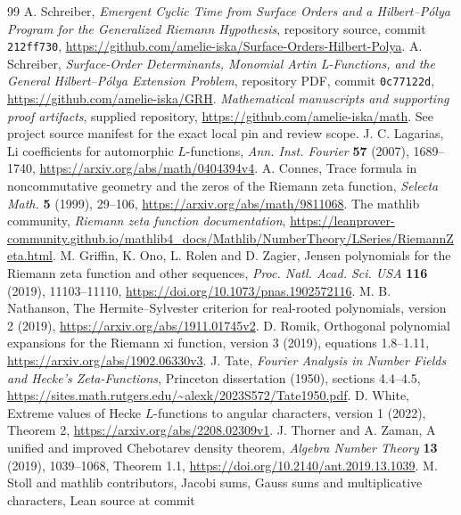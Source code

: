 \begin{thebibliography}{99}
 A. Schreiber, \emph{Emergent Cyclic Time from Surface Orders and a Hilbert--P\'olya Program for the Generalized Riemann Hypothesis}, repository source,
commit \texttt{212ff730}, \url{https://github.com/amelie-iska/Surface-Orders-Hilbert-Polya}.
 A. Schreiber, \emph{Surface-Order Determinants, Monomial Artin L-Functions, and the General Hilbert--P\'olya Extension Problem}, repository PDF,
commit \texttt{0c77122d}, \url{https://github.com/amelie-iska/GRH}.
 \emph{Mathematical manuscripts and supporting proof artifacts}, supplied repository, \url{https://github.com/amelie-iska/math}. See project source manifest for the exact local pin and review scope.
 J. C. Lagarias, Li coefficients for automorphic $L$-functions,
\emph{Ann. Inst. Fourier} \textbf{57} (2007), 1689--1740,
\url{https://arxiv.org/abs/math/0404394v4}.
 A. Connes, Trace formula in noncommutative geometry and the zeros
of the Riemann zeta function, \emph{Selecta Math.} \textbf{5} (1999), 29--106,
\url{https://arxiv.org/abs/math/9811068}.
 The mathlib community, \emph{Riemann zeta function documentation},
\url{https://leanprover-community.github.io/mathlib4_docs/Mathlib/NumberTheory/LSeries/RiemannZeta.html}.
 M. Griffin, K. Ono, L. Rolen and D. Zagier,
Jensen polynomials for the Riemann zeta function and other sequences,
\emph{Proc. Natl. Acad. Sci. USA} \textbf{116} (2019), 11103--11110,
\url{https://doi.org/10.1073/pnas.1902572116}.
 M. B. Nathanson, The Hermite--Sylvester criterion
for real-rooted polynomials, version 2 (2019),
\url{https://arxiv.org/abs/1911.01745v2}.
 D. Romik, Orthogonal polynomial expansions for the Riemann
xi function, version 3 (2019), equations 1.8--1.11,
\url{https://arxiv.org/abs/1902.06330v3}.
 J. Tate, \emph{Fourier Analysis in Number Fields and Hecke's
Zeta-Functions}, Princeton dissertation (1950), sections 4.4--4.5,
\url{https://sites.math.rutgers.edu/~alexk/2023S572/Tate1950.pdf}.
 D. White, Extreme values of Hecke $L$-functions to angular
characters, version 1 (2022), Theorem 2,
\url{https://arxiv.org/abs/2208.02309v1}.
 J. Thorner and A. Zaman, A unified and improved Chebotarev
density theorem, \emph{Algebra Number Theory} \textbf{13} (2019),
1039--1068, Theorem 1.1,
\url{https://doi.org/10.2140/ant.2019.13.1039}.
 M. Stoll and mathlib contributors, Jacobi sums,
Gauss sums and multiplicative characters, Lean source at commit

\end{thebibliography}
